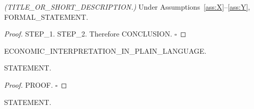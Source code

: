 %

\begin{proposition}\label{prop:LABEL}
\textit{(TITLE_OR_SHORT_DESCRIPTION.)} Under Assumptions~\ref{ass:X}--\ref{ass:Y},
FORMAL_STATEMENT.
\end{proposition}

\begin{proof}
STEP_1. STEP_2. Therefore CONCLUSION. $\square$
\end{proof}

\begin{remark}
ECONOMIC_INTERPRETATION_IN_PLAIN_LANGUAGE.
\end{remark}

\begin{lemma}\label{lem:LABEL}
STATEMENT.
\end{lemma}

\begin{proof}
PROOF. $\square$
\end{proof}

\begin{corollary}\label{cor:LABEL}
STATEMENT.
\end{corollary}
